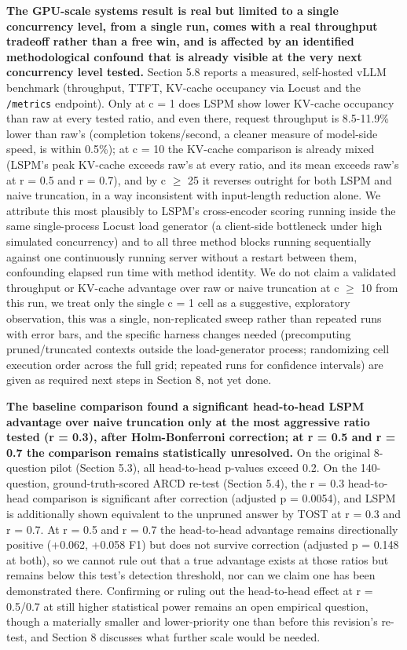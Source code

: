 \textbf{The GPU-scale systems result is real but limited to a single concurrency level, from a single run, comes with a real throughput tradeoff rather than a free win, and is affected by an identified methodological confound that is already visible at the very next concurrency level tested.} Section 5.8 reports a measured, self-hosted vLLM benchmark (throughput, TTFT, KV-cache occupancy via Locust and the \texttt{/metrics} endpoint). Only at c = 1 does LSPM show lower KV-cache occupancy than raw at every tested ratio, and even there, request throughput is 8.5-11.9\% lower than raw's (completion tokens/second, a cleaner measure of model-side speed, is within 0.5\%); at c = 10 the KV-cache comparison is already mixed (LSPM's peak KV-cache exceeds raw's at every ratio, and its mean exceeds raw's at r = 0.5 and r = 0.7), and by c $\geq$ 25 it reverses outright for both LSPM and naive truncation, in a way inconsistent with input-length reduction alone. We attribute this most plausibly to LSPM's cross-encoder scoring running inside the same single-process Locust load generator (a client-side bottleneck under high simulated concurrency) and to all three method blocks running sequentially against one continuously running server without a restart between them, confounding elapsed run time with method identity. We do not claim a validated throughput or KV-cache advantage over raw or naive truncation at c $\geq$ 10 from this run, we treat only the single c = 1 cell as a suggestive, exploratory observation, this was a single, non-replicated sweep rather than repeated runs with error bars, and the specific harness changes needed (precomputing pruned/truncated contexts outside the load-generator process; randomizing cell execution order across the full grid; repeated runs for confidence intervals) are given as required next steps in Section 8, not yet done.

\textbf{The baseline comparison found a significant head-to-head LSPM advantage over naive truncation only at the most aggressive ratio tested (r = 0.3), after Holm-Bonferroni correction; at r = 0.5 and r = 0.7 the comparison remains statistically unresolved.} On the original 8-question pilot (Section 5.3), all head-to-head p-values exceed 0.2. On the 140-question, ground-truth-scored ARCD re-test (Section 5.4), the r = 0.3 head-to-head comparison is significant after correction (adjusted p = 0.0054), and LSPM is additionally shown equivalent to the unpruned answer by TOST at r = 0.3 and r = 0.7. At r = 0.5 and r = 0.7 the head-to-head advantage remains directionally positive (+0.062, +0.058 F1) but does not survive correction (adjusted p = 0.148 at both), so we cannot rule out that a true advantage exists at those ratios but remains below this test's detection threshold, nor can we claim one has been demonstrated there. Confirming or ruling out the head-to-head effect at r = 0.5/0.7 at still higher statistical power remains an open empirical question, though a materially smaller and lower-priority one than before this revision's re-test, and Section 8 discusses what further scale would be needed.


